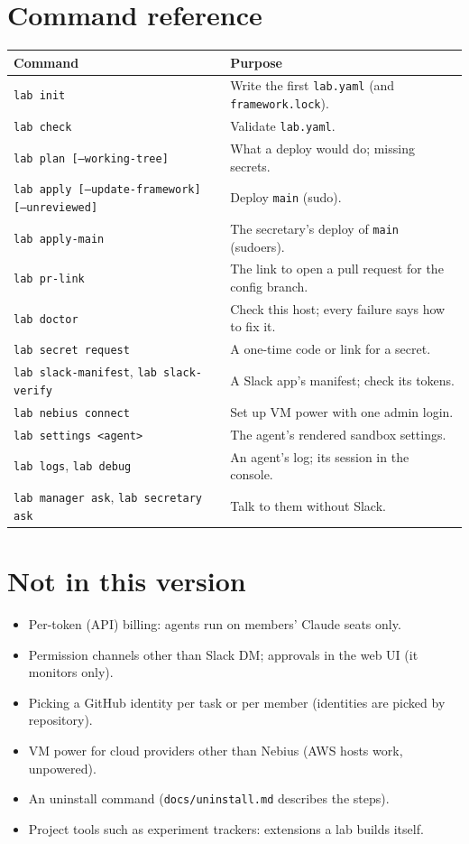\documentclass[11pt]{article}
\newcommand{\code}[1]{\texttt{#1}}
\begin{document}
\section{Command reference}
\begin{tabularx}{\linewidth}{lL}
\toprule
Command & Purpose \\
\midrule
\code{lab init} & Write the first \code{lab.yaml} (and \code{framework.lock}). \\
\code{lab check} & Validate \code{lab.yaml}. \\
\code{lab plan [--working-tree]} & What a deploy would do; missing secrets. \\
\code{lab apply [--update-framework] [--unreviewed]} & Deploy \code{main} (sudo). \\
\code{lab apply-main} & The secretary's deploy of \code{main} (sudoers). \\
\code{lab pr-link} & The link to open a pull request for the config branch. \\
\code{lab doctor} & Check this host; every failure says how to fix it. \\
\code{lab secret request} & A one-time code or link for a secret. \\
\code{lab slack-manifest}, \code{lab slack-verify} & A Slack app's manifest; check its tokens. \\
\code{lab nebius connect} & Set up VM power with one admin login. \\
\code{lab settings <agent>} & The agent's rendered sandbox settings. \\
\code{lab logs}, \code{lab debug} & An agent's log; its session in the console. \\
\code{lab manager ask}, \code{lab secretary ask} & Talk to them without Slack. \\
\bottomrule
\end{tabularx}

\section{Not in this version}
\begin{itemize}
  \item Per-token (API) billing: agents run on members' Claude seats only.
  \item Permission channels other than Slack DM; approvals in the web UI (it monitors only).
  \item Picking a GitHub identity per task or per member (identities are picked by
    repository).
  \item VM power for cloud providers other than Nebius (AWS hosts work, unpowered).
  \item An uninstall command (\code{docs/uninstall.md} describes the steps).
  \item Project tools such as experiment trackers: extensions a lab builds itself.
\end{itemize}
\end{document}
